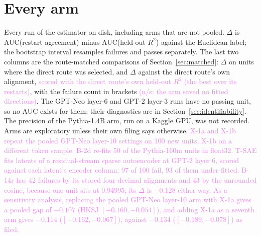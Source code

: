 \documentclass[10pt]{article}
\newcommand{\draft}[1]{\textcolor{violet}{#1}}
\begin{document}
\FloatBarrier
\section{Every arm}
\label{app:arms}
Every run of the estimator on disk, including arms that are not pooled. $\Delta$ is
AUC(restart agreement) minus AUC(held-out $R^2$) against the Euclidean label; the bootstrap
interval resamples failures and passes separately. The last two columns are the
route-matched comparisons of Section~\ref{sec:matched}: $\Delta$ on units where the direct
route was selected, and $\Delta$ against the direct route's own alignment, \draft{scored with the direct
route's own held-out $R^2$ (the best over its restarts)}, with the failure count in brackets
\draft{(n/s: the arm saved no fitted directions)}. The GPT-Neo layer-6 and GPT-2 layer-3 runs
have no passing unit, so no AUC exists for them; their diagnostics are in
Section~\ref{sec:identifiability}. The precision of the Pythia-1.4B arm, run on a Kaggle GPU, was
not recorded. Arms are exploratory unless their own filing says otherwise. \draft{X-1a and X-1b
repeat the pooled GPT-Neo layer-10 settings on 100 new units, X-1b on a different token sample.
B-2d re-fits 50 of the Pythia-160m units in float32. T-SAE fits latents of a residual-stream
sparse autoencoder at GPT-2 layer 6, scored against each latent's encoder column; 97 of 100
fail, 93 of them under-fitted. B-14r has 42 failures by its stored four-decimal alignments
and 43 by the unrounded cosine, because one unit sits at 0.94995; its $\Delta$ is $-0.128$ either
way. As a sensitivity analysis, replacing the pooled GPT-Neo layer-10 arm with X-1a gives a pooled gap of $-0.107$
(HKSJ $[-0.160, -0.054]$), and adding X-1a as a seventh arm gives $-0.114$
($[-0.162, -0.067]$), against $-0.134$ ($[-0.189, -0.078]$) as filed.}
\end{document}

